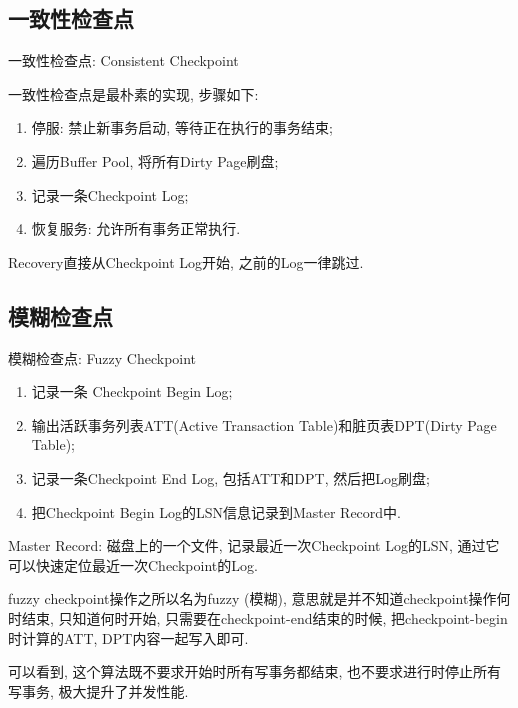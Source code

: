 \subsection{一致性检查点}

一致性检查点: Consistent Checkpoint

一致性检查点是最朴素的实现, 步骤如下:
\begin{enumerate}
    \item 停服: 禁止新事务启动, 等待正在执行的事务结束;
    \item 遍历Buffer Pool, 将所有Dirty Page刷盘;
    \item 记录一条Checkpoint Log;
    \item 恢复服务: 允许所有事务正常执行.
\end{enumerate}
Recovery直接从Checkpoint Log开始, 之前的Log一律跳过.

\subsection{模糊检查点}

模糊检查点: Fuzzy Checkpoint

\begin{enumerate}
    \item 记录一条 Checkpoint Begin Log;
    \item 输出活跃事务列表ATT(Active Transaction Table)和脏页表DPT(Dirty Page Table);
    \item 记录一条Checkpoint End Log, 包括ATT和DPT, 然后把Log刷盘;
    \item 把Checkpoint Begin Log的LSN信息记录到Master Record中.
\end{enumerate}

Master Record: 磁盘上的一个文件, 记录最近一次Checkpoint Log的LSN, 通过它可以快速定位最近一次Checkpoint的Log.

fuzzy checkpoint操作之所以名为fuzzy (模糊), 意思就是并不知道checkpoint操作何时结束, 
只知道何时开始, 只需要在checkpoint-end结束的时候, 把checkpoint-begin时计算的ATT, DPT内容一起写入即可.

可以看到, 这个算法既不要求开始时所有写事务都结束, 也不要求进行时停止所有写事务, 极大提升了并发性能.


